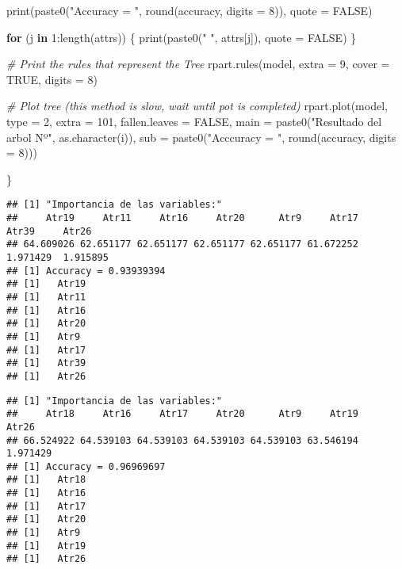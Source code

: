 \documentclass[
]{article}
\newenvironment{Shaded}{\begin{snugshade}}{\end{snugshade}}
\newcommand{\AttributeTok}[1]{\textcolor[rgb]{0.77,0.63,0.00}{#1}}
\newcommand{\CommentTok}[1]{\textcolor[rgb]{0.56,0.35,0.01}{\textit{#1}}}
\newcommand{\ConstantTok}[1]{\textcolor[rgb]{0.00,0.00,0.00}{#1}}
\newcommand{\ControlFlowTok}[1]{\textcolor[rgb]{0.13,0.29,0.53}{\textbf{#1}}}
\newcommand{\DecValTok}[1]{\textcolor[rgb]{0.00,0.00,0.81}{#1}}
\newcommand{\FunctionTok}[1]{\textcolor[rgb]{0.00,0.00,0.00}{#1}}
\newcommand{\NormalTok}[1]{#1}
\newcommand{\SpecialCharTok}[1]{\textcolor[rgb]{0.00,0.00,0.00}{#1}}
\newcommand{\StringTok}[1]{\textcolor[rgb]{0.31,0.60,0.02}{#1}}
\begin{document}
\begin{Shaded}
\begin{Highlighting}[]
  \FunctionTok{print}\NormalTok{(}\FunctionTok{paste0}\NormalTok{(}\StringTok{"Accuracy = "}\NormalTok{, }\FunctionTok{round}\NormalTok{(accuracy, }\AttributeTok{digits =} \DecValTok{8}\NormalTok{)), }\AttributeTok{quote =} \ConstantTok{FALSE}\NormalTok{)}
  
  \ControlFlowTok{for}\NormalTok{ (j }\ControlFlowTok{in} \DecValTok{1}\SpecialCharTok{:}\FunctionTok{length}\NormalTok{(attrs)) \{}
    \FunctionTok{print}\NormalTok{(}\FunctionTok{paste0}\NormalTok{(}\StringTok{"  "}\NormalTok{, attrs[j]), }\AttributeTok{quote =} \ConstantTok{FALSE}\NormalTok{)}
\NormalTok{  \}}
  
  \CommentTok{\# Print the rules that represent the Tree}
  \FunctionTok{rpart.rules}\NormalTok{(model, }\AttributeTok{extra =} \DecValTok{9}\NormalTok{, }\AttributeTok{cover =} \ConstantTok{TRUE}\NormalTok{, }\AttributeTok{digits =} \DecValTok{8}\NormalTok{)}
  
  \CommentTok{\# Plot tree (this method is slow, wait until pot is completed)}
  \FunctionTok{rpart.plot}\NormalTok{(model,}
             \AttributeTok{type =} \DecValTok{2}\NormalTok{,}
             \AttributeTok{extra =} \DecValTok{101}\NormalTok{,}
             \AttributeTok{fallen.leaves =} \ConstantTok{FALSE}\NormalTok{,}
             \AttributeTok{main =} \FunctionTok{paste0}\NormalTok{(}\StringTok{"Resultado del arbol Nº"}\NormalTok{, }\FunctionTok{as.character}\NormalTok{(i)),}
             \AttributeTok{sub =} \FunctionTok{paste0}\NormalTok{(}\StringTok{"Acccuracy = "}\NormalTok{, }\FunctionTok{round}\NormalTok{(accuracy, }\AttributeTok{digits =} \DecValTok{8}\NormalTok{)))}

\NormalTok{\}}
\end{Highlighting}
\end{Shaded}

\begin{verbatim}
## [1] "Importancia de las variables:"
##     Atr19     Atr11     Atr16     Atr20      Atr9     Atr17     Atr39     Atr26 
## 64.609026 62.651177 62.651177 62.651177 62.651177 61.672252  1.971429  1.915895 
## [1] Accuracy = 0.93939394
## [1]   Atr19
## [1]   Atr11
## [1]   Atr16
## [1]   Atr20
## [1]   Atr9
## [1]   Atr17
## [1]   Atr39
## [1]   Atr26
\end{verbatim}

\begin{verbatim}
## [1] "Importancia de las variables:"
##     Atr18     Atr16     Atr17     Atr20      Atr9     Atr19     Atr26 
## 66.524922 64.539103 64.539103 64.539103 64.539103 63.546194  1.971429 
## [1] Accuracy = 0.96969697
## [1]   Atr18
## [1]   Atr16
## [1]   Atr17
## [1]   Atr20
## [1]   Atr9
## [1]   Atr19
## [1]   Atr26
\end{verbatim}
\end{document}
